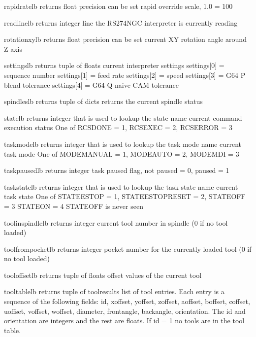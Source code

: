 \documentclass[letterpaper,10pt,english]{sphinxmanual}
\begin{document}
\begin{sphinxVerbatim}[commandchars=\\\{\}]
rapidrate\PYGZus{}lb \PYGZhy{} returns float \PYGZhy{} precision can be set
rapid override scale, 1.0 = 100\PYGZpc{}

read\PYGZus{}line\PYGZus{}lb \PYGZhy{} returns integer
line the RS274NGC interpreter is currently reading

rotation\PYGZus{}xy\PYGZus{}lb \PYGZhy{} returns float \PYGZhy{} precision can be set
current XY rotation angle around Z axis

settings\PYGZus{}lb \PYGZhy{} returns tuple of floats
current interpreter settings
settings[0] = sequence number
settings[1] = feed rate
settings[2] = speed
settings[3] = G64 P blend tolerance
settings[4] = G64 Q naive CAM tolerance

spindles\PYGZus{}lb \PYGZhy{} returns tuple of dicts
returns the current spindle status

state\PYGZus{}lb \PYGZhy{} returns integer that is used to lookup the state name
current command execution status
One of RCS\PYGZus{}DONE = 1, RCS\PYGZus{}EXEC = 2, RCS\PYGZus{}ERROR = 3

task\PYGZus{}mode\PYGZus{}lb \PYGZhy{} returns integer that is used to lookup the task mode name
current task mode
One of  MODE\PYGZus{}MANUAL = 1, MODE\PYGZus{}AUTO = 2, MODE\PYGZus{}MDI = 3

task\PYGZus{}paused\PYGZus{}lb \PYGZhy{} returns integer
task paused flag, not paused = 0, paused = 1

task\PYGZus{}state\PYGZus{}lb \PYGZhy{} returns integer that is used to lookup the task state name
current task state
One of STATE\PYGZus{}ESTOP = 1, STATE\PYGZus{}ESTOP\PYGZus{}RESET = 2, STATE\PYGZus{}OFF = 3 STATE\PYGZus{}ON = 4
STATE\PYGZus{}OFF is never seen

tool\PYGZus{}in\PYGZus{}spindle\PYGZus{}lb \PYGZhy{} returns integer
current tool number in spindle (0 if no tool loaded)

tool\PYGZus{}from\PYGZus{}pocket\PYGZus{}lb \PYGZhy{} returns integer
pocket number for the currently loaded tool (0 if no tool loaded)

tool\PYGZus{}offset\PYGZus{}lb \PYGZhy{} returns tuple of floats
offset values of the current tool

tool\PYGZus{}table\PYGZus{}lb \PYGZhy{} returns tuple of tool\PYGZus{}results
list of tool entries. Each entry is a sequence of the following fields: id,
xoffset, yoffset, zoffset, aoffset, boffset, coffset, uoffset, voffset,
woffset, diameter, frontangle, backangle, orientation. The id and orientation
are integers and the rest are floats.
If id = \PYGZhy{}1 no tools are in the tool table.
\end{sphinxVerbatim}
\end{document}
